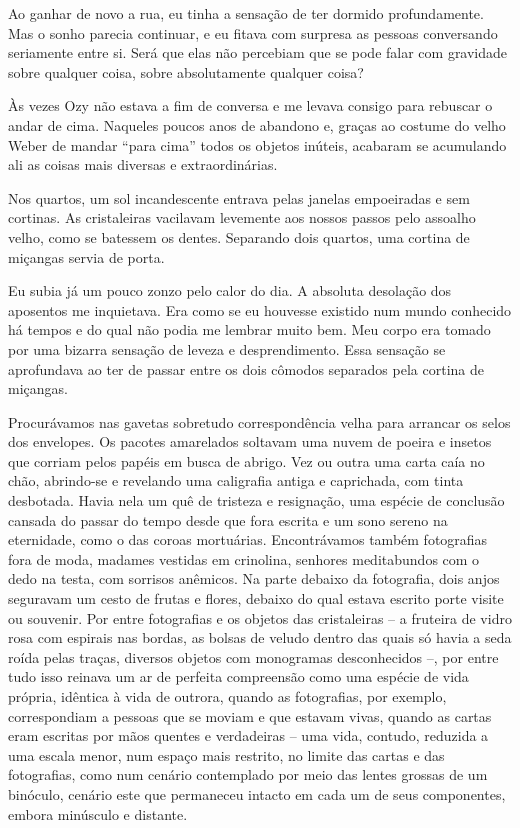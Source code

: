 Ao ganhar de novo a rua, eu tinha a sensação de ter dormido profundamente. Mas o sonho parecia continuar, e eu fitava com surpresa as pessoas conversando seriamente entre si. Será que elas não percebiam que se pode falar com gravidade sobre qualquer coisa, sobre absolutamente qualquer coisa?

Às vezes Ozy não estava a fim de conversa e me levava consigo para rebuscar o andar de cima. Naqueles poucos anos de abandono e, graças ao costume do velho Weber de mandar ``para cima'' todos os objetos inúteis, acabaram se acumulando ali as coisas mais diversas e extraordinárias.

Nos quartos, um sol incandescente entrava pelas janelas empoeiradas e sem cortinas. As cristaleiras vacilavam levemente aos nossos passos pelo assoalho velho, como se batessem os dentes. Separando dois quartos, uma cortina de miçangas servia de porta.

Eu subia já um pouco zonzo pelo calor do dia. A absoluta desolação dos aposentos me inquietava. Era como se eu houvesse existido num mundo conhecido há tempos e do qual não podia me lembrar muito bem. Meu corpo era tomado por uma bizarra sensação de leveza e desprendimento. Essa sensação se aprofundava ao ter de passar entre os dois cômodos separados pela cortina de miçangas.

Procurávamos nas gavetas sobretudo correspondência velha para arrancar os selos dos envelopes. Os pacotes amarelados soltavam uma nuvem de poeira e insetos que corriam pelos papéis em busca de abrigo. Vez ou outra uma carta caía no chão, abrindo-se e revelando uma caligrafia antiga e caprichada, com tinta desbotada. Havia nela um quê de tristeza e resignação, uma espécie de conclusão cansada do passar do tempo desde que fora escrita e um sono sereno na eternidade, como o das coroas mortuárias. Encontrávamos também fotografias fora de moda, madames vestidas em crinolina, senhores meditabundos com o dedo na testa, com sorrisos anêmicos. Na parte debaixo da fotografia, dois anjos seguravam um cesto de frutas e flores, debaixo do qual estava escrito porte visite ou souvenir. Por entre fotografias e os objetos das cristaleiras -- a fruteira de vidro rosa com espirais nas bordas, as bolsas de veludo dentro das quais só havia a seda roída pelas traças, diversos objetos com monogramas desconhecidos --, por entre tudo isso reinava um ar de perfeita compreensão como uma espécie de vida própria, idêntica à vida de outrora, quando as fotografias, por exemplo, correspondiam a pessoas que se moviam e que estavam vivas, quando as cartas eram escritas por mãos quentes e verdadeiras -- uma vida, contudo, reduzida a uma escala menor, num espaço mais restrito, no limite das cartas e das fotografias, como num cenário contemplado por meio das lentes grossas de um binóculo, cenário este que permaneceu intacto em cada um de seus componentes, embora minúsculo e distante.

